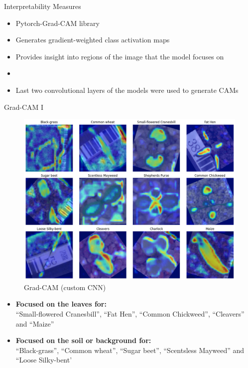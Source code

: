 \documentclass{beamer}
\begin{document}
\begin{frame}{Interpretability Measures}
    \begin{itemize}
        \item Pytorch-Grad-CAM library~\cite{jacobgilpytorchcam}
        \item Generates gradient-weighted class activation maps
        \item Provides insight into regions of the image that the model focuses on
        \item[] \vspace{0.5cm}
        \item Last two convolutional layers of the models were used to generate CAMs
    \end{itemize}
\end{frame}

\begin{frame}{Grad-CAM I}
    \begin{figure}
        \includegraphics[width=0.4\linewidth]{../resources/custom_cnn/grad_cam.png}
        \caption{Grad-CAM (custom CNN)}\label{fig:grad-cam-custom-cnn}
    \end{figure}

    \begin{itemize}
        \item \textbf{Focused on the leaves for:\\}``Small-flowered Cranesbill'', ``Fat Hen'', ``Common Chickweed'', ``Cleavers'' and ``Maize''
        \item \textbf{Focused on the soil or background for:\\}``Black-grass'', ``Common wheat'', ``Sugar beet'', ``Scentsless Mayweed'' and ``Loose Silky-bent'
    \end{itemize}
\end{frame}
\end{document}

